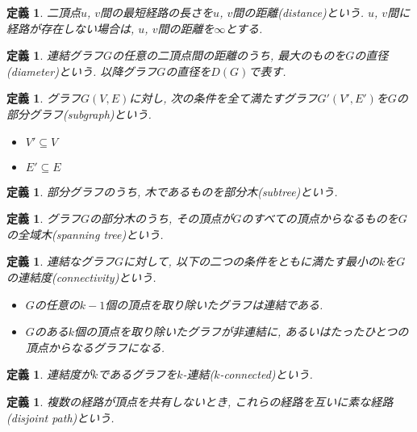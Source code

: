 \documentclass[11pt,a4j]{jsarticle}
\theoremstyle{plain}
\newtheorem{defi}[theo]{定義}
\def\vu{\mbox{\boldmath $u$}}
\def\vv{\mbox{\boldmath $v$}}
\begin{document}
\begin{defi}
二頂点{\vu , \vv}間の最短経路の長さを{\vu , \vv}間の距離(distance)という. {\vu , \vv}間に経路が存在しない場合は, {\vu , \vv}間の距離を$\infty$とする.
\end{defi}

\begin{defi}
連結グラフ$G$の任意の二頂点間の距離のうち, 最大のものを$G$の直径(diameter)という. 以降グラフ$G$の直径を$D(G)$で表す.
\end{defi}

\begin{defi}
グラフ$G(V,E)$に対し, 次の条件を全て満たすグラフ$G'(V', E')$を$G$の部分グラフ(subgraph)という.
\begin{itemize}
\item $V' \subseteq V$
\item $E' \subseteq E$
\end{itemize}
\end{defi}


\begin{defi}
部分グラフのうち, 木であるものを部分木(subtree)という.
\end{defi}

\begin{defi}
グラフ$G$の部分木のうち, その頂点が$G$のすべての頂点からなるものを$G$の全域木(spanning tree)という.
\end{defi}

\begin{defi}
連結なグラフ$G$に対して, 以下の二つの条件をともに満たす最小の$k$を$G$の連結度(connectivity)という.
\begin{itemize}
\item $G$の任意の$k - 1$個の頂点を取り除いたグラフは連結である.
\item $G$のある$k$個の頂点を取り除いたグラフが非連結に, あるいはたったひとつの頂点からなるグラフになる.
\end{itemize}
\end{defi}

\begin{defi}
連結度が$k$であるグラフを$k$-連結($k$-connected)という.
\end{defi}


\begin{defi}
複数の経路が頂点を共有しないとき, これらの経路を互いに素な経路(disjoint path)という.
\end{defi}
\end{document}
